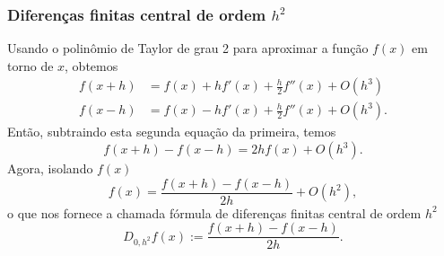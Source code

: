 \subsubsection{Diferenças finitas central de ordem $h^2$}

Usando o polinômio de Taylor de grau 2 para aproximar a função $f(x)$ em torno de $x$, obtemos
\begin{align}
  f(x+h) &= f(x) + hf'(x) + \frac{h}{2}f''(x) + O(h^3)\\
  f(x-h) &= f(x) - hf'(x) + \frac{h}{2}f''(x) + O(h^3).
\end{align}
Então, subtraindo esta segunda equação da primeira, temos
\begin{equation}
  f(x+h)-f(x-h) = 2hf(x) + O(h^3).
\end{equation}
Agora, isolando $f(x)$
\begin{equation}
  f(x) = \frac{f(x+h)-f(x-h)}{2h} + O(h^2),
\end{equation}
o que nos fornece a chamada fórmula de diferenças finitas central de ordem $h^2$
\begin{equation}\label{eq:dfc_h2}
  D_{0,h^2}f(x) := \frac{f(x+h)-f(x-h)}{2h}.
\end{equation}

